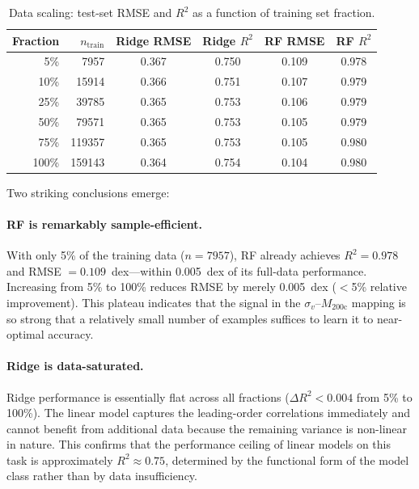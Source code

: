 \documentclass[12pt, a4paper]{article}
\newcommand{\Mhalo}{M_{200\mathrm{c}}}
\newcommand{\sigmav}{\sigma_v}
\begin{document}
\begin{table}[H]
  \centering
  \caption{Data scaling: test-set RMSE and $R^2$ as a function of training set fraction.}
  \label{tab:scaling}
  \begin{tabular}{@{}rr|cc|cc@{}}
    \toprule
    Fraction & $n_\mathrm{train}$ & Ridge RMSE & Ridge $R^2$ & RF RMSE & RF $R^2$ \\
    \midrule
    5\%   & \num{7957}   & 0.367 & 0.750 & 0.109 & 0.978 \\
    10\%  & \num{15914}  & 0.366 & 0.751 & 0.107 & 0.979 \\
    25\%  & \num{39785}  & 0.365 & 0.753 & 0.106 & 0.979 \\
    50\%  & \num{79571}  & 0.365 & 0.753 & 0.105 & 0.979 \\
    75\%  & \num{119357} & 0.365 & 0.753 & 0.105 & 0.980 \\
    100\% & \num{159143} & 0.364 & 0.754 & 0.104 & 0.980 \\
    \bottomrule
  \end{tabular}
\end{table}

Two striking conclusions emerge:

\paragraph{RF is remarkably sample-efficient.}
With only 5\% of the training data ($n = \num{7957}$), RF already achieves $R^2 = 0.978$ and RMSE $= 0.109$~dex---within 0.005~dex of its full-data performance.  Increasing from 5\% to 100\% reduces RMSE by merely 0.005~dex ($<$5\% relative improvement).  This plateau indicates that the signal in the $\sigmav$--$\Mhalo$ mapping is so strong that a relatively small number of examples suffices to learn it to near-optimal accuracy.

\paragraph{Ridge is data-saturated.}
Ridge performance is essentially flat across all fractions ($\Delta R^2 < 0.004$ from 5\% to 100\%).  The linear model captures the leading-order correlations immediately and cannot benefit from additional data because the remaining variance is non-linear in nature.  This confirms that the performance ceiling of linear models on this task is approximately $R^2 \approx 0.75$, determined by the functional form of the model class rather than by data insufficiency.
\end{document}
